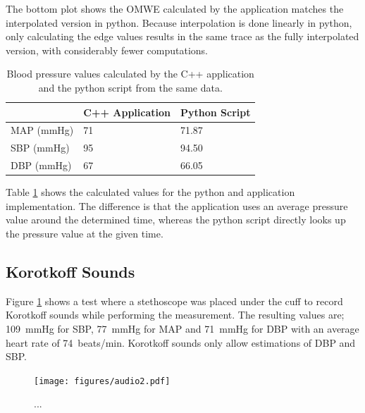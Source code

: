 The bottom plot shows the OMWE calculated by the application matches the interpolated version in python. Because interpolation is done linearly in python, only calculating the edge values results in the same trace as the fully interpolated version, with considerably fewer computations.


\begin{table}[b]\label{tbl:sumAlgo}
\centering
\begin{tabular}{lll}
\hline
           & C++ Application & Python Script\\ \hline
MAP (mmHg) & 71	             & 71.87        \\ \hline
SBP (mmHg) & 95              & 94.50        \\ \hline
DBP (mmHg) & 67              & 66.05        \\ \hline
\end{tabular}
\caption{Blood pressure values calculated by the C++ application and the python script from the same data.}
\end{table}

Table \ref{tbl:sumAlgo} shows the calculated values for the python and application implementation. The difference is that the application uses an average pressure value around the determined time, whereas the python script directly looks up the pressure value at the given time. 



\subsection{Korotkoff Sounds}\label{sec:koro}

Figure \ref{fig:audio} shows a test where a stethoscope was placed under the cuff to record Korotkoff sounds while performing the measurement. The resulting values are; \SI{109}{\mmHg} for SBP, \SI{77}{\mmHg} for MAP and \SI{71}{\mmHg} for DBP with an average heart rate of \SI{74}{beats/\minute}. Korotkoff sounds only allow estimations of DBP and SBP.


\begin{figure}[ht!]
\centering
\texttt{[image: figures/audio2.pdf]}
\caption{...}
\label{fig:audio}
\end{figure} 

